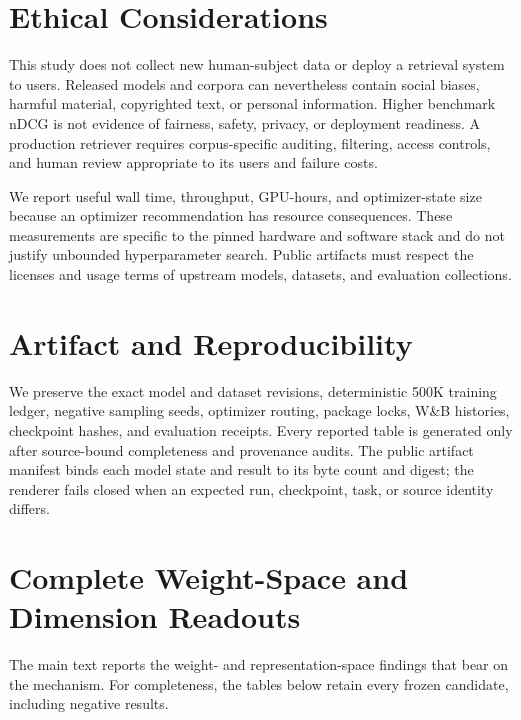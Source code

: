 \documentclass[11pt]{article}
\begin{document}
\section{Ethical Considerations}

This study does not collect new human-subject data or deploy a retrieval system to users. Released
models and corpora can nevertheless contain social biases, harmful material, copyrighted text, or
personal information. Higher benchmark nDCG is not evidence of fairness, safety, privacy, or
deployment readiness. A production retriever requires corpus-specific auditing, filtering, access
controls, and human review appropriate to its users and failure costs.

We report useful wall time, throughput, GPU-hours, and optimizer-state size because an optimizer
recommendation has resource consequences. These measurements are specific to the pinned hardware
and software stack and do not justify unbounded hyperparameter search. Public artifacts must respect
the licenses and usage terms of upstream models, datasets, and evaluation collections.



\appendix

\section{Artifact and Reproducibility}

We preserve the exact model and dataset revisions, deterministic 500K training ledger, negative
sampling seeds, optimizer routing, package locks, W\&B histories, checkpoint hashes, and evaluation
receipts. Every reported table is generated only after source-bound completeness and provenance
audits. The public artifact manifest binds each model state and result to its byte count and digest;
the renderer fails closed when an expected run, checkpoint, task, or source identity differs.

\section{Complete Weight-Space and Dimension Readouts}

The main text reports the weight- and representation-space findings that bear on the mechanism.
For completeness, the tables below retain every frozen candidate, including negative results.

\CorrectedGeometryBridgeTable
\end{document}
